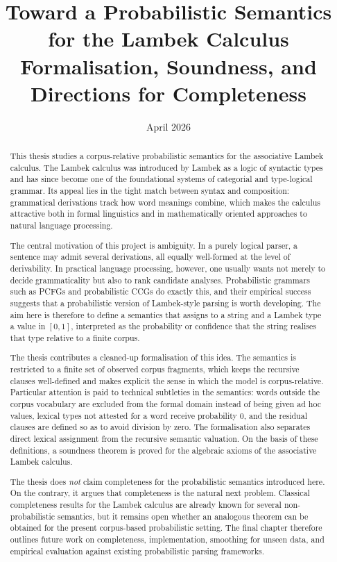 \documentclass[12pt,a4paper]{report}
\title{Toward a Probabilistic Semantics for the Lambek Calculus\\\large Formalisation, Soundness, and Directions for Completeness}
\date{April 2026}
\theoremstyle{definition}
\begin{document}
\maketitle
{}

\begin{abstract}
This thesis studies a corpus-relative probabilistic semantics for the associative Lambek
calculus. The Lambek calculus was introduced by Lambek as a logic of syntactic types and has
since become one of the foundational systems of categorial and type-logical grammar.
Its appeal lies in the tight match between syntax and composition: grammatical derivations
track how word meanings combine, which makes the calculus attractive both in formal
linguistics and in mathematically oriented approaches to natural language processing.

The central motivation of this project is ambiguity. In a purely logical parser, a sentence may
admit several derivations, all equally well-formed at the level of derivability. In practical
language processing, however, one usually wants not merely to decide grammaticality but also
to rank candidate analyses. Probabilistic grammars such as PCFGs and probabilistic CCGs do
exactly this, and their empirical success suggests that a probabilistic version of Lambek-style
parsing is worth developing. The aim here is therefore to define a semantics that assigns to a
string and a Lambek type a value in $[0,1]$, interpreted as the probability or confidence that
the string realises that type relative to a finite corpus.

The thesis contributes a cleaned-up formalisation of this idea. The semantics is restricted to a
finite set of observed corpus fragments, which keeps the recursive clauses well-defined and makes
explicit the sense in which the model is corpus-relative. Particular attention is paid to technical
subtleties in the semantics: words outside the corpus vocabulary are excluded from the formal
domain instead of being given ad hoc values, lexical types not attested for a word receive
probability $0$, and the residual clauses are defined so as to avoid division by zero. The
formalisation also separates direct lexical assignment from the recursive
semantic valuation. On the basis of these definitions, a soundness theorem is proved for the
algebraic axioms of the associative Lambek calculus.

The thesis does \emph{not} claim completeness for the probabilistic semantics introduced here.
On the contrary, it argues that completeness is the natural next problem. Classical completeness
results for the Lambek calculus are already known for several non-probabilistic semantics, but
it remains open whether an analogous theorem can be obtained for the present corpus-based
probabilistic setting. The final chapter therefore outlines future work on completeness,
implementation, smoothing for unseen data, and empirical evaluation against existing
probabilistic parsing frameworks.
\end{abstract}

\tableofcontents
\clearpage
{}








\printbibliography
\end{document}

